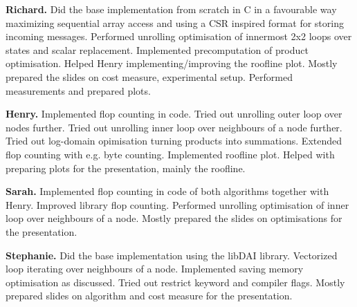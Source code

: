 \documentclass[letterpaper]{article}
\newcommand{\mypar}[1]{{\bf #1.}}
\begin{document}

\mypar{Richard} Did the base implementation from scratch in C in a favourable way maximizing sequential array access and using a CSR inspired format for storing incoming messages. Performed unrolling optimisation of innermost 2x2 loops over states and scalar replacement. Implemented precomputation of product optimisation. Helped Henry implementing/improving the roofline plot. Mostly prepared the slides on cost measure, experimental setup. Performed measurements and prepared plots.

\mypar{Henry} Implemented flop counting in code. Tried out unrolling outer loop over nodes further. Tried out unrolling inner loop over neighbours of a node further. Tried out log-domain opimisation turning products into summations. Extended flop counting with e.g. byte counting. Implemented roofline plot. Helped with preparing plots for the presentation, mainly the roofline.

\mypar{Sarah} Implemented flop counting in code of both algorithms together with Henry. Improved library flop counting. Performed unrolling optimisation of inner loop over neighbours of a node. Mostly prepared the slides on optimisations for the presentation.

\mypar{Stephanie} Did the base implementation using the libDAI library. Vectorized loop iterating over neighbours of a node. Implemented saving memory optimisation as discussed. Tried out restrict keyword and compiler flags. Mostly prepared slides on algorithm and cost measure for the presentation.

%


\end{document}
